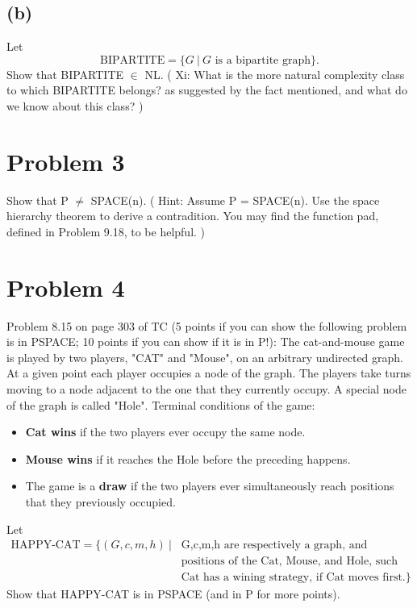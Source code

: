 \documentclass[twoside,11pt]{homework}
\begin{document}
\subsection*{(b)}
\begin{prob}
  Let
  \[
    \text{BIPARTITE} = \{ G \ |\ G \text{ is a bipartite graph} \}.
  \]
  Show that BIPARTITE $\in$ NL.
  ( Xi: What is the more natural complexity class to which BIPARTITE belongs?
    as suggested by the fact mentioned, and what do we know about this class?
  )
\end{prob}

\section*{Problem 3}

\begin{prob}
  Show that P $\ne$ SPACE(n).
  ( Hint: Assume P = SPACE(n).
    Use the space hierarchy theorem to derive a contradition.
    You may find the function pad, defined in Problem 9.18, to be helpful.
  )
\end{prob}

\section*{Problem 4}

\begin{prob}
  Problem 8.15 on page 303 of TC (5 points if you can show the following problem
  is in PSPACE; 10 points if you can show if it is in P!):
  The cat-and-mouse game is played by two players, "CAT" and "Mouse", on an
  arbitrary undirected graph.
  At a given point each player occupies a node of the graph.
  The players take turns moving to a node adjacent to the one that they
  currently occupy.
  A special node of the graph is called "Hole".
  Terminal conditions of the game:
  \begin{itemize}
  \item \textbf{Cat wins} if the two players ever occupy the same node.
  \item \textbf{Mouse wins} if it reaches the Hole before the preceding happens.
  \item The game is a \textbf{draw} if the two players ever simultaneously reach
    positions that they previously occupied.
  \end{itemize} 
  Let
  \[
    \begin{aligned}
      \text{HAPPY-CAT} = \{ (G,c,m,h) \ | \
      &\text{G,c,m,h are respectively a graph, and}\\
      &\text{positions of the Cat, Mouse, and Hole, such that}\\
      &\text{Cat has a wining strategy, if Cat moves first}.\}
    \end{aligned}
  \]
  Show that HAPPY-CAT is in PSPACE (and in P for more points).
\end{prob}
\end{document}
